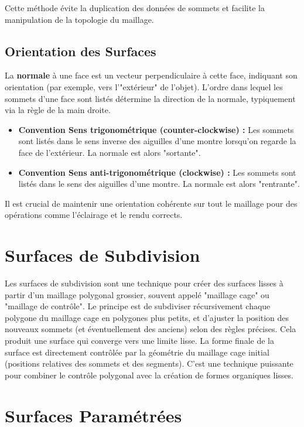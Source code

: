 \documentclass{article}
\begin{document}
Cette méthode évite la duplication des données de sommets et facilite la manipulation de la topologie du maillage.

\subsection{Orientation des Surfaces}
La \textbf{normale} à une face est un vecteur perpendiculaire à cette face, indiquant son orientation (par exemple, vers l'"extérieur" de l'objet). L'ordre dans lequel les sommets d'une face sont listés détermine la direction de la normale, typiquement via la règle de la main droite.
\begin{itemize}
    \item \textbf{Convention Sens trigonométrique (counter-clockwise) :} Les sommets sont listés dans le sens inverse des aiguilles d'une montre lorsqu'on regarde la face de l'extérieur. La normale est alors "sortante".
    \item \textbf{Convention Sens anti-trigonométrique (clockwise) :} Les sommets sont listés dans le sens des aiguilles d'une montre. La normale est alors "rentrante".
\end{itemize}
Il est crucial de maintenir une orientation cohérente sur tout le maillage pour des opérations comme l'éclairage et le rendu corrects.

\section{Surfaces de Subdivision}

Les surfaces de subdivision sont une technique pour créer des surfaces lisses à partir d'un maillage polygonal grossier, souvent appelé "maillage cage" ou "maillage de contrôle".
Le principe est de subdiviser récursivement chaque polygone du maillage cage en polygones plus petits, et d'ajuster la position des nouveaux sommets (et éventuellement des anciens) selon des règles précises. Cela produit une surface qui converge vers une limite lisse.
La forme finale de la surface est directement contrôlée par la géométrie du maillage cage initial (positions relatives des sommets et des segments). C'est une technique puissante pour combiner le contrôle polygonal avec la création de formes organiques lisses.

\section{Surfaces Paramétrées}
\end{document}
